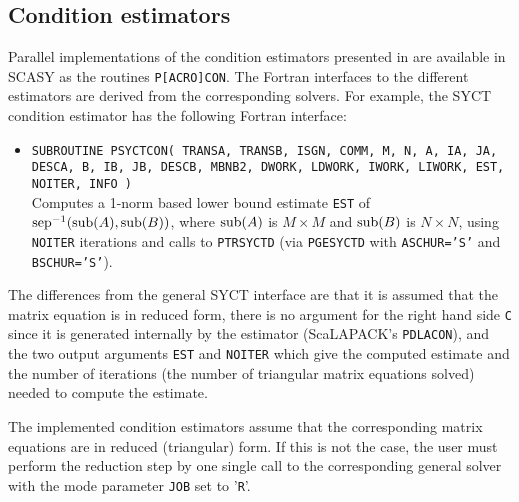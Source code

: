 \documentclass[11pt]{article}
\begin{document}
\subsection{Condition estimators}
\label{sec:estimators} Parallel implementations of the condition
estimators presented in \cite{granatkagstrom09a,granatkagstrom09b}
are available in SCASY as the routines \texttt{P[ACRO]CON}. The
Fortran interfaces to the different estimators are derived from
the corresponding solvers. For example, the SYCT condition
estimator has the following Fortran interface:

\begin{itemize}
\item \texttt{SUBROUTINE PSYCTCON( TRANSA, TRANSB, ISGN, COMM, M,
N, A, IA, JA, DESCA, B, IB, JB, DESCB, MBNB2, DWORK, LDWORK,
IWORK, LIWORK, EST, NOITER, INFO )} \\
Computes a 1-norm based lower bound estimate \texttt{EST} of ${\rm
sep}^{-1}({\rm sub}(A),{\rm sub}(B))$, where ${\rm sub}(A)$ is $M
\times M$ and ${\rm sub}(B)$ is $N \times N$, using
\texttt{NOITER} iterations and calls to \texttt{PTRSYCTD}
(via \texttt{PGESYCTD} with {\tt ASCHUR='S'} and {\tt BSCHUR='S'}). \\
\end{itemize}

The differences from the general SYCT interface are that it is
assumed that the matrix equation is in reduced form, there is no
argument for the right hand side \texttt{C} since it is generated
internally by the estimator (ScaLAPACK's \texttt{PDLACON}), and
the two output arguments \texttt{EST} and \texttt{NOITER} which
give the computed estimate and the number of iterations (the
number of triangular matrix equations solved) needed to compute
the estimate.

The implemented condition estimators assume that the corresponding
matrix equations are in reduced (triangular) form. If this is not
the case, the user must perform the reduction step by one single
call to the corresponding general solver with the mode parameter
\texttt{JOB} set to '\texttt{R}'.
\end{document}
